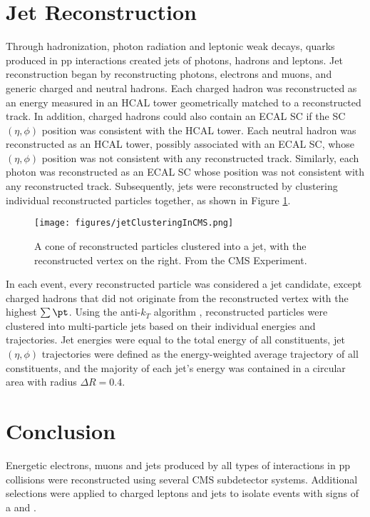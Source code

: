 \section{Jet Reconstruction}
\label{sec:jetReco}
Through hadronization, photon radiation and leptonic weak decays, quarks produced in pp interactions 
created jets of photons, hadrons and leptons.  Jet reconstruction began by reconstructing photons, 
electrons and muons, and generic charged and neutral hadrons.  Each charged hadron was reconstructed as 
an energy measured in an HCAL tower geometrically matched to a reconstructed track.  In addition, 
charged hadrons could also contain an ECAL SC if the SC $(\eta, \phi)$ position was consistent with 
the HCAL tower.  Each neutral hadron was reconstructed as an HCAL tower, possibly associated with 
an ECAL SC, whose $(\eta, \phi)$ position was not consistent with any reconstructed track.  Similarly, 
each photon was reconstructed as an ECAL SC whose position was not consistent with any reconstructed 
track.  Subsequently, jets were reconstructed by clustering individual reconstructed particles together, 
as shown in Figure \ref{fig:jetClustering}.

\begin{figure}[h]
	\centering
	\texttt{[image: figures/jetClusteringInCMS.png]}
	\caption{A cone of reconstructed particles clustered into a jet, with the reconstructed vertex on the right.  
	From the CMS Experiment.}
	\label{fig:jetClustering}
\end{figure}

In each event, every reconstructed particle was considered a jet candidate, except charged 
hadrons that did not originate from the reconstructed vertex with the highest $\sum \pt$.  Using the 
anti-$k_{T}$ algorithm \cite{antikt}, reconstructed particles were clustered into multi-particle jets 
based on their individual energies and trajectories.  Jet energies were equal to the total energy of 
all constituents, jet $(\eta, \phi)$ trajectories were defined as the energy-weighted average trajectory 
of all constituents, and the majority of each jet's energy was contained in a circular area with radius 
$\Delta R = 0.4$.


\section{Conclusion}
\label{sec:recoConclusion}
Energetic electrons, muons and jets produced by all types of interactions in pp collisions were 
reconstructed using several CMS subdetector systems.  Additional selections were applied to charged leptons 
and jets to isolate events with signs of a \WR and \nul.

